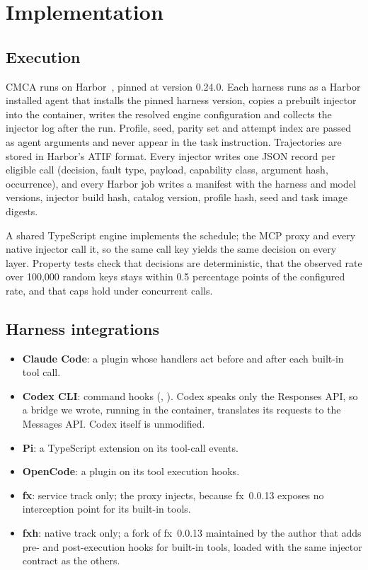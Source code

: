 \section{Implementation}
\label{sec:impl}

\subsection{Execution}

CMCA runs on Harbor~\citep{harbor}, pinned at version 0.24.0.
Each harness runs as a Harbor installed agent that installs the pinned harness version, copies a prebuilt injector into the container, writes the resolved engine configuration and collects the injector log after the run.
Profile, seed, parity set and attempt index are passed as agent arguments and never appear in the task instruction.
Trajectories are stored in Harbor's ATIF format.
Every injector writes one JSON record per eligible call (decision, fault type, payload, capability class, argument hash, occurrence), and every Harbor job writes a manifest with the harness and model versions, injector build hash, catalog version, profile hash, seed and task image digests.

A shared TypeScript engine implements the schedule; the MCP proxy and every native injector call it, so the same call key yields the same decision on every layer.
Property tests check that decisions are deterministic, that the observed rate over 100,000 random keys stays within 0.5 percentage points of the configured rate, and that caps hold under concurrent calls.

\subsection{Harness integrations}

\begin{itemize}
\item \textbf{Claude Code}: a plugin whose handlers act before and after each built-in tool call.
\item \textbf{Codex CLI}: command hooks (, ). Codex speaks only the Responses API, so a bridge we wrote, running in the container, translates its requests to the Messages API. Codex itself is unmodified.
\item \textbf{Pi}: a TypeScript extension on its tool-call events.
\item \textbf{OpenCode}: a plugin on its tool execution hooks.
\item \textbf{fx}: service track only; the proxy injects, because fx~0.0.13 exposes no interception point for its built-in tools.
\item \textbf{fxh}: native track only; a fork of fx~0.0.13 maintained by the author that adds pre- and post-execution hooks for built-in tools, loaded with the same injector contract as the others.
\end{itemize}

